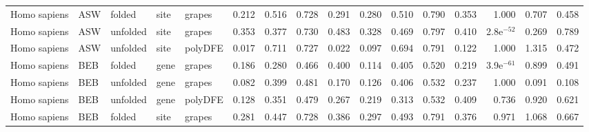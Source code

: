 \begin{longtable}{lllllrrrrrrrrrrr}
        Homo sapiens &                       ASW &    folded &  site &   grapes &                              0.212 &                               0.516 &                 0.728 &                 0.291 &                              0.280 &                               0.510 &                 0.790 &                 0.353 &         1.000 &  0.707 &  0.458 \\
        Homo sapiens &                       ASW &  unfolded &  site &   grapes &                              0.353 &                               0.377 &                 0.730 &                 0.483 &                              0.328 &                               0.469 &                 0.797 &                 0.410 &  2.8e$^{-52}$ &  0.269 &  0.789 \\
        Homo sapiens &                       ASW &  unfolded &  site &  polyDFE &                              0.017 &                               0.711 &                 0.727 &                 0.022 &                              0.097 &                               0.694 &                 0.791 &                 0.122 &         1.000 &  1.315 &  0.472 \\
        Homo sapiens &                       BEB &    folded &  gene &   grapes &                              0.186 &                               0.280 &                 0.466 &                 0.400 &                              0.114 &                               0.405 &                 0.520 &                 0.219 &  3.9e$^{-61}$ &  0.899 &  0.491 \\
        Homo sapiens &                       BEB &  unfolded &  gene &   grapes &                              0.082 &                               0.399 &                 0.481 &                 0.170 &                              0.126 &                               0.406 &                 0.532 &                 0.237 &         1.000 &  0.091 &  0.108 \\
        Homo sapiens &                       BEB &  unfolded &  gene &  polyDFE &                              0.128 &                               0.351 &                 0.479 &                 0.267 &                              0.219 &                               0.313 &                 0.532 &                 0.409 &         0.736 &  0.920 &  0.621 \\
        Homo sapiens &                       BEB &    folded &  site &   grapes &                              0.281 &                               0.447 &                 0.728 &                 0.386 &                              0.297 &                               0.493 &                 0.791 &                 0.376 &         0.971 &  1.068 &  0.667 \\

\end{longtable}
